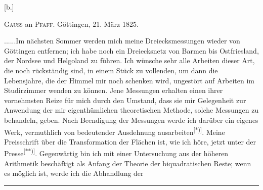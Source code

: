 \begin{center}[b.]\par\medskip \textsc{Gauss} an \textsc{Pfaff}. Göttingen, 21. März 1825.\end{center}
\noindent .\enspace .\enspace .\enspace .\enspace .\enspace .\quad Im nächsten Sommer werden mich meine Dreiecksmessungen wieder von Göttingen entfernen; ich habe noch ein Dreiecksnetz von Barmen bis Ostfriesland, der Nordsee und Helgoland zu führen. Ich wünsche sehr alle Arbeiten dieser Art, die noch rückständig sind, in einem Stück zu vollenden, um dann die Lebensjahre, die der Himmel mir noch schenken wird, ungestört auf Arbeiten im Studirzimmer wenden zu können. Jene Messungen erhalten einen ihrer vornehmsten Reize für mich durch den Umstand, dass sie mir Gelegenheit zur Anwendung der mir eigenthümlichen theoretischen Methode, solche Messungen zu behandeln, geben. Nach Beendigung der Messungen werde ich darüber ein eigenes Werk, vermuthlich von bedeutender Ausdehnung ausarbeiten\textsuperscript{[*)]}. Meine Preisschrift über die Transformation der Flächen ist, wie ich höre, jetzt unter der Presse\textsuperscript{[**)]}. Gegenwärtig bin ich mit einer Untersuchung aus der höheren Arithmetik beschäftigt als Anfang der Theorie der biquadratischen Reste; wenn es möglich ist, werde ich die Abhandlung der
\par\vfill\noindent\rule{.25\linewidth}{.4pt}\par\smallskip
\begingroup\footnotesize
{}\par
{}\par\endgroup
